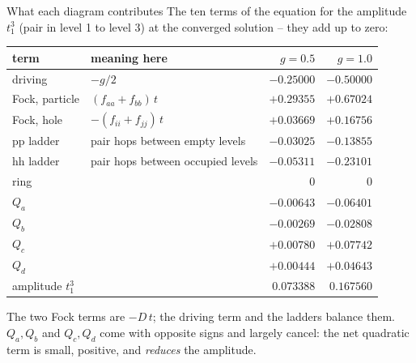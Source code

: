 \documentclass[aspectratio=169,10pt]{beamer}
\begin{document}
\begin{frame}[shrink=1]{What each diagram contributes}
\small
The ten terms of the equation for the amplitude $t_1^3$ (pair in level 1 to level 3) at the converged solution -- they add up to zero:
\begin{center}
\renewcommand{\arraystretch}{1.0}
\begin{tabular}{llrr}
\toprule
term & meaning here & $g=0.5$ & $g=1.0$\\
\midrule
driving & $-g/2$ & $-0.25000$ & $-0.50000$\\
Fock, particle & $(f_{aa}+f_{bb})\,t$ & $+0.29355$ & $+0.67024$\\
Fock, hole & $-(f_{ii}+f_{jj})\,t$ & $+0.03669$ & $+0.16756$\\
pp ladder & pair hops between empty levels & $-0.03025$ & $-0.13855$\\
hh ladder & pair hops between occupied levels & $-0.05311$ & $-0.23101$\\
ring & & $0$ & $0$\\
$Q_a$ & & $-0.00643$ & $-0.06401$\\
$Q_b$ & & $-0.00269$ & $-0.02808$\\
$Q_c$ & & $+0.00780$ & $+0.07742$\\
$Q_d$ & & $+0.00444$ & $+0.04643$\\
\midrule
amplitude $t_1^3$ & & $0.073388$ & $0.167560$\\
\bottomrule
\end{tabular}
\end{center}
The two Fock terms are $-D\,t$; the driving term and the ladders balance them. $Q_a,Q_b$ and $Q_c,Q_d$ come with opposite signs and largely cancel: the net quadratic term is small, positive, and \emph{reduces} the amplitude.
\end{frame}
\end{document}
